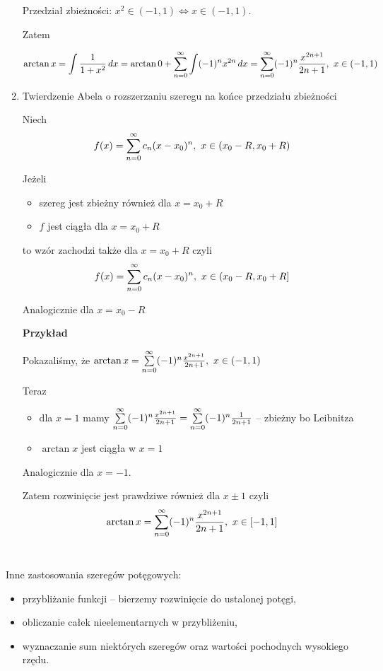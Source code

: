 \begin{enumerate}
    Przedział zbieżności: $ x^2\in(-1, 1) \Leftrightarrow x\in(-1, 1) $.

    Zatem

    $$ \arctan x = \int \frac{1}{1+x^2} \,dx = \arctan 0 + \sum\limits_{n = 0}^{\infty} \int (-1)^n x^{2n} \,dx
    = \sum\limits_{n = 0}^{\infty} (-1)^n \frac{x^{2n+1}}{2n+1}, \ x\in(-1, 1) $$

    \item Twierdzenie Abela o rozszerzaniu szeregu na końce przedziału zbieżności
    
    Niech
    $$ f(x) = \sum\limits_{n = 0}^{\infty} c_n (x - x_0)^n, \ x\in (x_0 - R, x_0 + R)$$

    Jeżeli
    \begin{itemize}
        \item szereg jest zbieżny również dla $ x = x_0 + R $
        \item $f$ jest ciągła dla $ x = x_0 + R $
    \end{itemize}

    to wzór zachodzi także dla $ x = x_0 + R $ czyli
    $$ f(x) = \sum\limits_{n = 0}^{\infty} c_n (x - x_0)^n, \ x\in (x_0 - R, x_0 + R] $$

    Analogicznie dla $ x = x_0 - R $

    \textbf{Przykład}

    Pokazaliśmy, że $ \arctan x = \sum\limits_{n = 0}^{\infty} (-1)^n \frac{x^{2n+1}}{2n+1}, \ x\in (-1, 1) $

    Teraz

    \begin{itemize}
        \item dla $x = 1$ mamy $ \sum\limits_{n = 0}^{\infty} (-1)^n \frac{x^{2n+1}}{2n+1} = \sum\limits_{n = 0}^{\infty} (-1)^n \frac{1}{2n+1} $ -- zbieżny bo Leibnitza
        \item $ \arctan x $ jest ciągła w $x = 1$
    \end{itemize}

    Analogicznie dla $ x = -1$.

    Zatem rozwinięcie jest prawdziwe również dla $x \pm 1$ czyli
    $$ \arctan x = \sum\limits_{n = 0}^{\infty} (-1)^n \frac{x^{2n+1}}{2n+1}, \ x\in [-1, 1] $$ \\
\end{enumerate}

Inne zastosowania szeregów potęgowych:

\begin{itemize}
    \item przybliżanie funkcji -- bierzemy rozwinięcie do ustalonej potęgi,
    \item obliczanie całek nieelementarnych w przybliżeniu,
    \item wyznaczanie sum niektórych szeregów oraz wartości pochodnych wysokiego rzędu.
\end{itemize}

